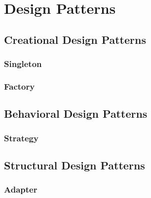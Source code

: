 \documentclass{article}
\begin{document}
\section{Design Patterns}

\subsection{Creational Design Patterns}

\subsubsection{Singleton}

\subsubsection{Factory}

\subsection{Behavioral Design Patterns}

\subsubsection{Strategy}

\subsection{Structural Design Patterns}

\subsubsection{Adapter}
\end{document}
